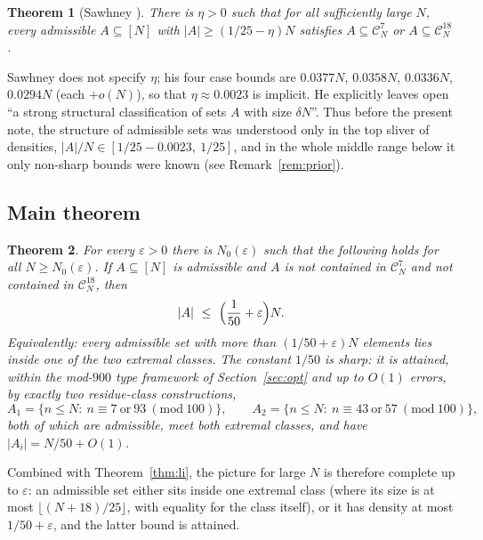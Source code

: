 \documentclass[11pt,a4paper]{article}
\theoremstyle{plain}
\newtheorem{theorem}{Theorem}[section]
\theoremstyle{definition}
\theoremstyle{remark}
\begin{document}
\begin{theorem}[Sawhney \cite{Sawhney}]\label{thm:sawhney}
There is $\eta>0$ such that for all sufficiently large $N$, every admissible $A\subseteq[N]$ with
$|A|\ge (1/25-\eta)N$ satisfies $A\subseteq \mathcal{C}^{7}_N$ or $A\subseteq \mathcal{C}^{18}_N$.
\end{theorem}

Sawhney does not specify $\eta$; his four case bounds are
$0.0377N$, $0.0358N$, $0.0336N$, $0.0294N$ (each $+o(N)$), so that $\eta\approx 0.0023$ is implicit.
He explicitly leaves open ``a strong structural classification of sets $A$ with size $\delta N$''.
Thus before the present note, the structure of admissible sets was understood only in the top
sliver of densities, $|A|/N\in[1/25-0.0023,\ 1/25]$, and in the whole middle range below it only
non-sharp bounds were known (see Remark~\ref{rem:prior}).

\subsection{Main theorem}

\begin{theorem}\label{thm:main}
For every $\varepsilon>0$ there is $N_0(\varepsilon)$ such that the following holds for all
$N\ge N_0(\varepsilon)$. If $A\subseteq[N]$ is admissible and $A$ is \emph{not} contained in
$\mathcal{C}^{7}_N$ and \emph{not} contained in $\mathcal{C}^{18}_N$, then
\[
 |A|\ \le\ \Bigl(\frac{1}{50}+\varepsilon\Bigr)N .
\]
Equivalently: every admissible set with more than $(1/50+\varepsilon)N$ elements lies inside one
of the two extremal classes. The constant $1/50$ is sharp: it is attained, within the mod-$900$
type framework of Section~\ref{sec:opt} and up to $O(1)$ errors, by exactly two residue-class
constructions,
\[
 A_1=\{n\le N:\ n\equiv 7\ \text{or}\ 93\ (\mathrm{mod}\ 100)\},\qquad
 A_2=\{n\le N:\ n\equiv 43\ \text{or}\ 57\ (\mathrm{mod}\ 100)\},
\]
both of which are admissible, meet both extremal classes, and have $|A_i|=N/50+O(1)$.
\end{theorem}

Combined with Theorem~\ref{thm:li}, the picture for large $N$ is therefore complete up to
$\varepsilon$: an admissible set either sits inside one extremal class (where its size is at most
$\lfloor (N+18)/25\rfloor$, with equality for the class itself), or it has density at most
$1/50+\varepsilon$, and the latter bound is attained.
\end{document}
